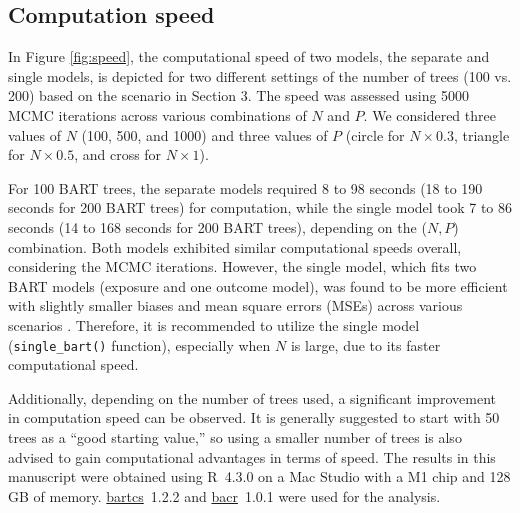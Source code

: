 \subsection{Computation speed}\label{sec:speed}
In Figure \ref{fig:speed}, the computational speed of two models, the separate and single models, is depicted for two different settings of the number of trees (100 vs. 200) based on the scenario in Section 3. The speed was assessed using 5000 MCMC iterations across various combinations of $N$ and $P$. We considered three values of $N$ (100, 500, and 1000) and three values of $P$ (circle for $N\times 0.3$, triangle for $N\times 0.5$, and cross for $N\times 1$).

For 100 BART trees, the separate models required 8 to 98 seconds (18 to 190 seconds for 200 BART trees) for computation, while the single model took 7 to 86 seconds (14 to 168 seconds for 200 BART trees), depending on the ($N, P$) combination. Both models exhibited similar computational speeds overall, considering the MCMC iterations. However, the single model, which fits two BART models (exposure and one outcome model), was found to be more efficient with slightly smaller biases and mean square errors (MSEs) across various scenarios \citep{kim2023bnp}. Therefore, it is recommended to utilize the single model (\verb|single_bart()| function), especially when $N$ is large, due to its faster computational speed.

Additionally, depending on the number of trees used, a significant improvement in computation speed can be observed. It is generally suggested to start with 50 trees as a ``good starting value,'' \citep{kapelner2013bartmachine} so using a smaller number of trees is also advised to gain computational advantages in terms of speed. 
The results in this manuscript were obtained using R~4.3.0 on a Mac Studio with
a M1 chip and 128 GB of memory. \href{https://cran.r-project.org/package=bartcs}{bartcs}~1.2.2 and \href{https://cran.r-project.org/package=bacr}{bacr}~1.0.1 were used for the analysis.



